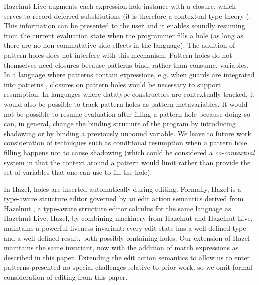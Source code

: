 Hazelnut Live augments each expression hole instance with a closure, which serves to record deferred substitutions 
(it is therefore a contextual type theory \cite{DBLP:journals/tocl/NanevskiPP08}). This information can be presented to the user and it enables soundly resuming from the current evaluation state when the programmer fills a hole (as long as there are no non-commutative side effects in the language).
The addition of pattern holes does not interfere with this mechanism. Pattern holes do not themselves need closures because patterns bind,
rather than consume, variables. In a language where patterns contain expressions, e.g. when guards are integrated into patterns \cite{Reppy2019}, closures on pattern holes would be necessary to support resumption. In languages where datatype constructors are contextually tracked, it would also be possible to track pattern holes as pattern metavariables. It would not be possible to resume evaluation after filling a pattern hole because doing so can, in general, change the binding structure of the program by introducing shadowing or by binding a previously unbound variable. We leave to future work consideration of techniques such as 
conditional resumption when a pattern hole filling happens not to cause shadowing (which could be considered a \emph{co-contextual} system in that the context around a pattern would limit rather than provide the set of variables that one can use to fill the hole).

In Hazel, holes are inserted automatically during editing. Formally, Hazel is a type-aware structure editor governed by an edit action semantics derived from Hazelnut \cite{DBLP:conf/popl/OmarVHAH17}, a type-aware structure editor calculus 
for the same language as Hazelnut Live. 
Hazel, by combining machinery from Hazelnut and Hazelnut Live, maintains a powerful liveness invariant: every edit state has a well-defined type
and a well-defined result, both possibly containing holes.
Our extension of Hazel maintains the same invariant, now with the addition of match expressions 
as described in this paper. 
Extending the edit action semantics to allow us to enter patterns presented no special challenges relative to prior work, so we omit formal consideration of editing from this paper.

